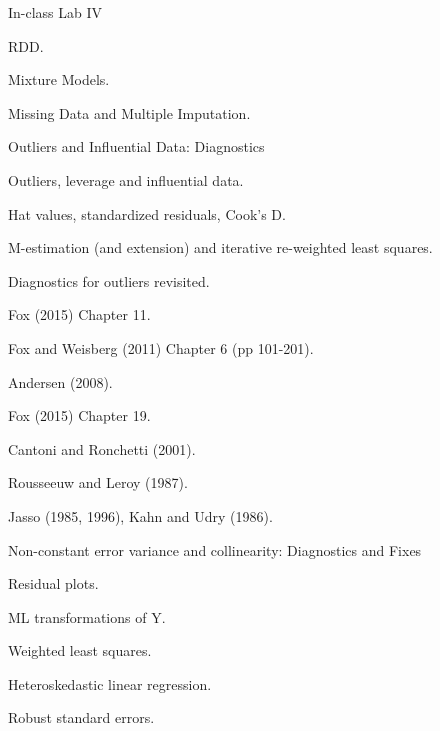 \documentclass[letterpaper]{article}
\renewenvironment{itemize}{
  \begin{list}{}{
    \setlength{\leftmargin}{1.5em}
  }
}{
  \end{list}
}
\begin{document}
\begin{enumerate}
	

	\item In-class Lab IV

			\begin{itemize}
				\item[$\square$] RDD.
				\item[$\square$] Mixture Models.
				\item[$\square$] Missing Data and Multiple Imputation.
			\end{itemize}




	\item Outliers and Influential Data: Diagnostics


			\begin{itemize}
				\item[$\square$] Outliers, leverage and influential data.
				\item[$\square$] Hat values, standardized residuals, Cook's D.
				\item[$\square$] M-estimation (and extension) and iterative re-weighted least squares.
				\item[$\square$] Diagnostics for outliers revisited.
			\end{itemize}


			\begin{itemize}
				\item[$\star$] Fox (2015) Chapter 11.
				\item[$\star$] Fox and Weisberg (2011) Chapter 6 (pp 101-201).
				\item[$\star$] Andersen (2008).
				\item[$\star$] Fox (2015) Chapter 19.
				\item[-] Cantoni and Ronchetti (2001).
				\item[-] Rousseeuw and Leroy (1987).
				\item[-] Jasso (1985, 1996), Kahn and Udry (1986).
			\end{itemize}



	\item Non-constant error variance and collinearity: Diagnostics and Fixes


			\begin{itemize}
				\item[$\square$] Residual plots.
				\item[$\square$] ML transformations of Y.
				\item[$\square$] Weighted least squares.
				\item[$\square$] Heteroskedastic linear regression.
				\item[$\square$] Robust standard errors.
			\end{itemize}




\end{enumerate}
\end{document}
